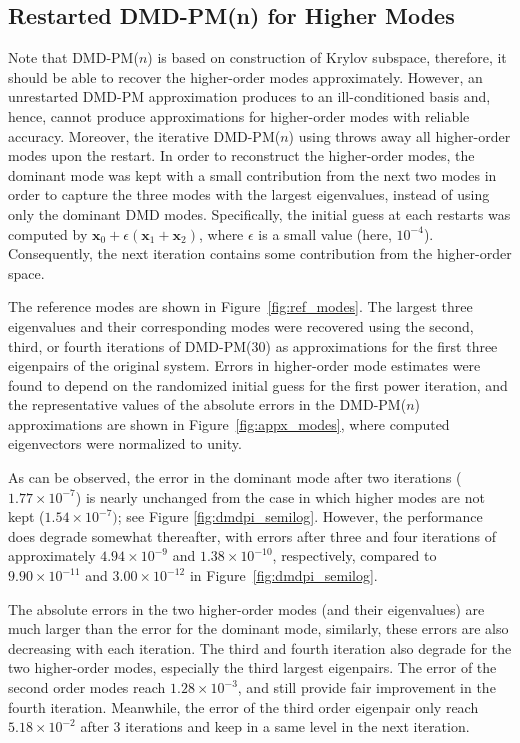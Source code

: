 \subsection{Restarted DMD-PM(n) for Higher Modes}
Note that DMD-PM($n$) is based on construction of Krylov subspace, therefore, it should be able to recover the higher-order modes approximately.
However, an unrestarted DMD-PM approximation produces to an ill-conditioned basis and, hence, cannot produce approximations for higher-order modes with reliable accuracy.
Moreover, the iterative DMD-PM($n$) using  throws away all higher-order modes upon the restart.
In order to reconstruct the higher-order modes, the dominant mode was kept with a small contribution from the next two modes in order to capture the three modes with the largest eigenvalues, instead of using only the dominant DMD modes.
Specifically, the initial guess at each restarts was computed by $\mathbf{x}_0 + \epsilon ( \mathbf{x}_1 + \mathbf{x}_2)$, where $\epsilon$ is a small value (here, $10^{-4}$).
Consequently, the next iteration contains some contribution from the higher-order space.

The reference modes are shown in Figure~\ref{fig:ref_modes}.
The largest three eigenvalues and their corresponding modes were recovered using the second, third, or fourth iterations of DMD-PM($30$) as approximations for the first three eigenpairs of the original system.
Errors in higher-order mode estimates were found to depend on the randomized initial guess for the first power iteration, and the representative values of the absolute errors in the DMD-PM($n$) approximations are shown in Figure~\ref{fig:appx_modes}, where computed eigenvectors were normalized to unity. 

As can be observed, the error in the dominant mode after two iterations ($1.77\times 10^{-7}$) is nearly unchanged from the case in which higher modes are not kept ($1.54\times 10^{-7})$; see Figure \ref{fig:dmdpi_semilog}.
However, the performance does degrade somewhat thereafter, with errors after three and four iterations of approximately $4.94\times 10^{-9}$ and $1.38\times 10^{-10}$, respectively, compared to $9.90\times 10^{-11}$ and $3.00\times 10^{-12}$ in Figure~\ref{fig:dmdpi_semilog}.

The absolute errors in the two higher-order modes (and their eigenvalues) are much larger than the error for the dominant mode, similarly, these errors are also decreasing with each iteration.
The third and fourth iteration also degrade for the two higher-order modes, especially the third largest eigenpairs. 
The error of the second order modes reach $1.28\times 10^{-3}$, and still provide fair improvement in the fourth iteration.
Meanwhile, the error of the third order eigenpair only reach $5.18\times 10^{-2}$ after 3 iterations and keep in a same level in the next iteration.

